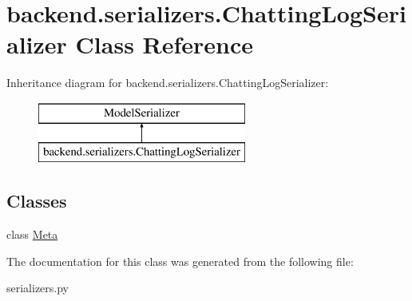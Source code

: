 \hypertarget{classbackend_1_1serializers_1_1_chatting_log_serializer}{}\section{backend.\+serializers.\+Chatting\+Log\+Serializer Class Reference}
\label{classbackend_1_1serializers_1_1_chatting_log_serializer}
Inheritance diagram for backend.\+serializers.\+Chatting\+Log\+Serializer\+:\begin{figure}[H]
\begin{center}
\leavevmode
\includegraphics[height=2.000000cm]{classbackend_1_1serializers_1_1_chatting_log_serializer}
\end{center}
\end{figure}
\subsection*{Classes}
\begin{DoxyCompactItemize}
\item 
class \hyperlink{classbackend_1_1serializers_1_1_chatting_log_serializer_1_1_meta}{Meta}
\end{DoxyCompactItemize}


The documentation for this class was generated from the following file\+:\begin{DoxyCompactItemize}
\item 
serializers.\+py\end{DoxyCompactItemize}
